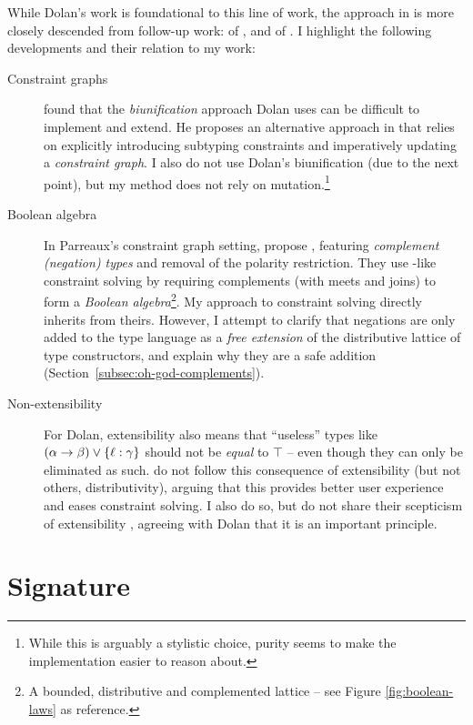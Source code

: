 While Dolan's work is foundational to this line of work, the approach in \inference{} is more closely descended from follow-up work: \simplesub{} of \textcite{simple-sub}, and \mlstruct{} of \textcite{mlstruct}. I highlight the following developments and their relation to my work: \begin{description}
    \item[Constraint graphs] \textcite{simple-sub} found that the \emph{biunification} approach Dolan uses can be difficult to implement and extend. He proposes an alternative approach in \simplesub{} that relies on explicitly introducing subtyping constraints and imperatively updating a \emph{constraint graph}. I also do not use Dolan's biunification (due to the next point), but my method does not rely on mutation.\footnote{While this is arguably a stylistic choice, purity seems to make the implementation easier to reason about.}
    \item[Boolean algebra] In Parreaux's constraint graph setting, \textcite{mlstruct} propose \mlstruct{}, featuring \emph{complement (negation) types} and removal of the polarity restriction. They use \simplesub{}-like constraint solving by requiring complements (with meets and joins) to form a \emph{Boolean algebra}\footnote{A bounded, distributive and complemented lattice -- see Figure \ref{fig:boolean-laws} as reference.}. My approach to constraint solving directly inherits from theirs. However, I attempt to clarify that negations are only added to the type language as a \emph{free extension} of the distributive lattice of type constructors, and explain why they are a safe addition (Section~\ref{subsec:oh-god-complements}).
    \item[Non-extensibility] For Dolan, extensibility also means that \enquote{useless} types like $(\alpha \to \beta) \join \flrec{\ell : \gamma}$ should not be \emph{equal} to $\top$ \cite[Section~1.4.1]{dolan-thesis} -- even though they can only be eliminated as such. \textcite{mlstruct} do not follow this consequence of extensibility (but not others, \eg{} distributivity), arguing that this provides better user experience and eases constraint solving. I also do so, but do not share their scepticism of extensibility \cite{simple-sub}, agreeing with Dolan that it is an important principle. 
\end{description}

\section{Signature}
\label{sec:signature}


